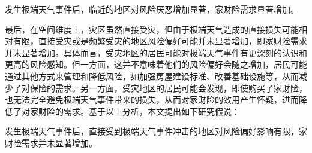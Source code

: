 \begin{hyp} \label{hyp:3}
    发生极端天气事件后，临近的地区对风险厌恶增加显著，家财险需求显著增加。
\end{hyp}

最后，在空间维度上，灾区虽然直接受灾，但由于极端天气造成的直接损失可能相对有限，直接受灾或是频繁受灾的地区风险偏好可能并未显著增加\citep{shao2024typhoons}，即家财险需求并未显著增加。具体而言，受灾地区的居民可能对极端天气事件有更深刻的认识和更高的风险感知。但一方面，这并不意味着他们的风险偏好会随之增加，居民可能通过其他方式来管理和降低风险，如加强房屋建设标准、改善基础设施等，从而减少了对保险的需求。另一方面，受灾地区的居民可能会发现，即使购买了家财险，也无法完全避免极端天气事件带来的损失，从而对家财险的效用产生怀疑，进而降低了对家财险的需求。基于以上分析，本文提出如下研究假说：

\begin{hyp} \label{hyp:2}
    发生极端天气事件后，直接受到极端天气事件冲击的地区对风险偏好影响有限，家财险需求并未显著增加。
\end{hyp}
